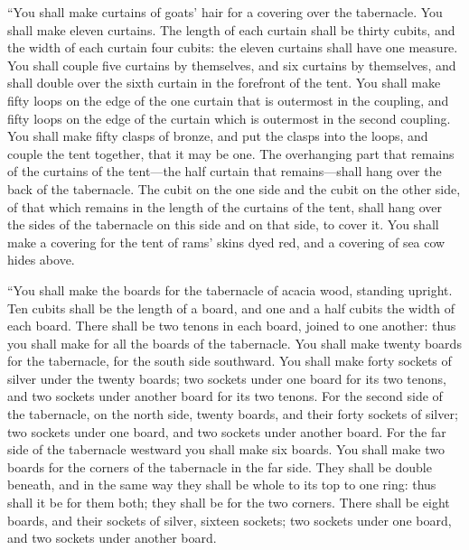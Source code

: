  ``You shall make curtains of goats' hair for a covering
over the tabernacle. You shall make eleven curtains.  The
length of each curtain shall be thirty cubits, and the width of each
curtain four cubits: the eleven curtains shall have one measure.
 You shall couple five curtains by themselves, and six
curtains by themselves, and shall double over the sixth curtain in the
forefront of the tent.  You shall make fifty loops on the
edge of the one curtain that is outermost in the coupling, and fifty
loops on the edge of the curtain which is outermost in the second
coupling.  You shall make fifty clasps of bronze, and put
the clasps into the loops, and couple the tent together, that it may be
one.  The overhanging part that remains of the curtains of
the tent---the half curtain that remains---shall hang over the back of
the tabernacle.  The cubit on the one side and the cubit on
the other side, of that which remains in the length of the curtains of
the tent, shall hang over the sides of the tabernacle on this side and
on that side, to cover it.  You shall make a covering for
the tent of rams' skins dyed red, and a covering of sea cow hides above.

 ``You shall make the boards for the tabernacle of acacia
wood, standing upright.  Ten cubits shall be the length of
a board, and one and a half cubits the width of each board.
 There shall be two tenons in each board, joined to one
another: thus you shall make for all the boards of the tabernacle.
 You shall make twenty boards for the tabernacle, for the
south side southward.  You shall make forty sockets of
silver under the twenty boards; two sockets under one board for its two
tenons, and two sockets under another board for its two tenons.
 For the second side of the tabernacle, on the north side,
twenty boards,  and their forty sockets of silver; two
sockets under one board, and two sockets under another board.
 For the far side of the tabernacle westward you shall make
six boards.  You shall make two boards for the corners of
the tabernacle in the far side.  They shall be double
beneath, and in the same way they shall be whole to its top to one ring:
thus shall it be for them both; they shall be for the two corners.
 There shall be eight boards, and their sockets of silver,
sixteen sockets; two sockets under one board, and two sockets under
another board.

